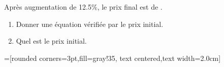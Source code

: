 \documentclass[main.tex]{subfiles}
\begin{document}
\begin{exercise}\hfill 
	
	\noindent\parbox{0.70\linewidth}{
Après augmentation de 12.5\%, le prix final est de .  
\begin{enumerate}[label=\alph*), leftmargin=*]
	\item Donner une équation vérifiée par le prix initial. \dotfill 
	\item Quel est le prix initial.\dotfill
\end{enumerate} 
 }\parbox{0.23\linewidth}{
=[rounded corners=3pt,fill=gray!35, text centered,text width=2.0cm]
}	 
\end{exercise} 
\end{document}

